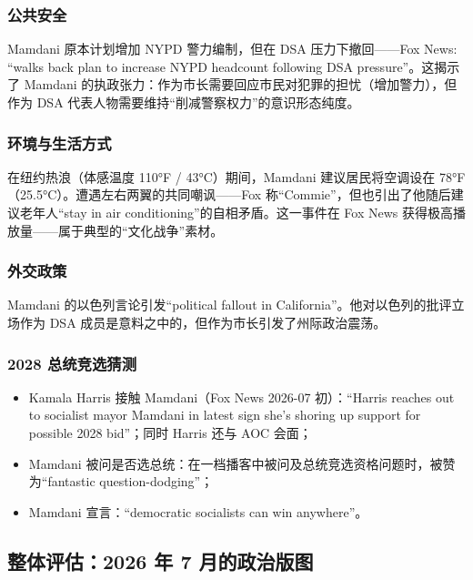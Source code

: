 \documentclass[12pt,a4paper]{ctexart}
\begin{document}
\subsubsection{公共安全}

Mamdani 原本计划增加 NYPD 警力编制，但在 DSA 压力下撤回——Fox News: ``walks back plan to increase NYPD headcount following DSA pressure''。这揭示了 Mamdani 的执政张力：作为市长需要回应市民对犯罪的担忧（增加警力），但作为 DSA 代表人物需要维持``削减警察权力''的意识形态纯度。

\subsubsection{环境与生活方式}

在纽约热浪（体感温度 110°F / 43°C）期间，Mamdani 建议居民将空调设在 78°F（25.5°C）。遭遇左右两翼的共同嘲讽——Fox 称``Commie''，但也引出了他随后建议老年人``stay in air conditioning''的自相矛盾。这一事件在 Fox News 获得极高播放量——属于典型的``文化战争''素材。

\subsubsection{外交政策}

Mamdani 的以色列言论引发``political fallout in California''。他对以色列的批评立场作为 DSA 成员是意料之中的，但作为市长引发了州际政治震荡。

\subsubsection{2028 总统竞选猜测}

\begin{itemize}
  \item Kamala Harris 接触 Mamdani（Fox News 2026-07 初）：``Harris reaches out to socialist mayor Mamdani in latest sign she's shoring up support for possible 2028 bid''；同时 Harris 还与 AOC 会面；
  \item Mamdani 被问是否选总统：在一档播客中被问及总统竞选资格问题时，被赞为``fantastic question-dodging''；
  \item Mamdani 宣言：``democratic socialists can win anywhere''。
\end{itemize}

\subsection{整体评估：2026 年 7 月的政治版图}
\end{document}

